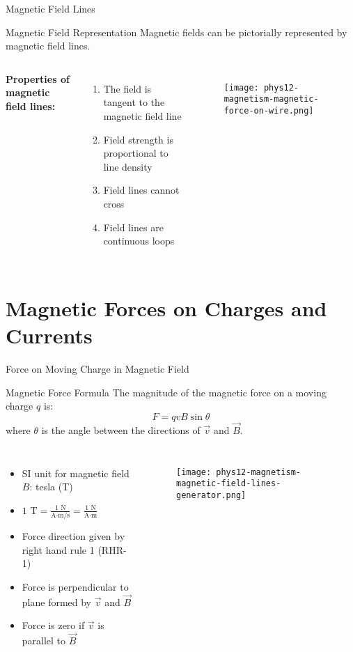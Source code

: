 \documentclass{beamer}
\begin{document}
\begin{frame}{Magnetic Field Lines}
\begin{block}{Magnetic Field Representation}
Magnetic fields can be pictorially represented by magnetic field lines.
\end{block}

\begin{columns}
\textbf{Properties of magnetic field lines:}
\begin{enumerate}
\item The field is tangent to the magnetic field line
\item Field strength is proportional to line density
\item Field lines cannot cross
\item Field lines are continuous loops
\end{enumerate}

\begin{figure}
    \centering
    \texttt{[image: phys12-magnetism-magnetic-force-on-wire.png]}
\end{figure}
\end{columns}
\end{frame}

\section{Magnetic Forces on Charges and Currents}

\begin{frame}{Force on Moving Charge in Magnetic Field}
\begin{block}{Magnetic Force Formula}
The magnitude of the magnetic force on a moving charge $q$ is:
\begin{equation}
F = qvB\sin\theta
\end{equation}
where $\theta$ is the angle between the directions of $\vec{v}$ and $\vec{B}$.
\end{block}

\begin{columns}
\begin{itemize}
\item SI unit for magnetic field $B$: tesla (T)
\item $1 \text{ T} = \frac{1 \text{ N}}{\text{A}\cdot\text{m/s}} = \frac{1 \text{ N}}{\text{A}\cdot\text{m}}$
\item Force direction given by right hand rule 1 (RHR-1)
\item Force is perpendicular to plane formed by $\vec{v}$ and $\vec{B}$
\item Force is zero if $\vec{v}$ is parallel to $\vec{B}$
\end{itemize}

\begin{figure}
    \centering
    \texttt{[image: phys12-magnetism-magnetic-field-lines-generator.png]}
\end{figure}
\end{columns}
\end{frame}
\end{document}

